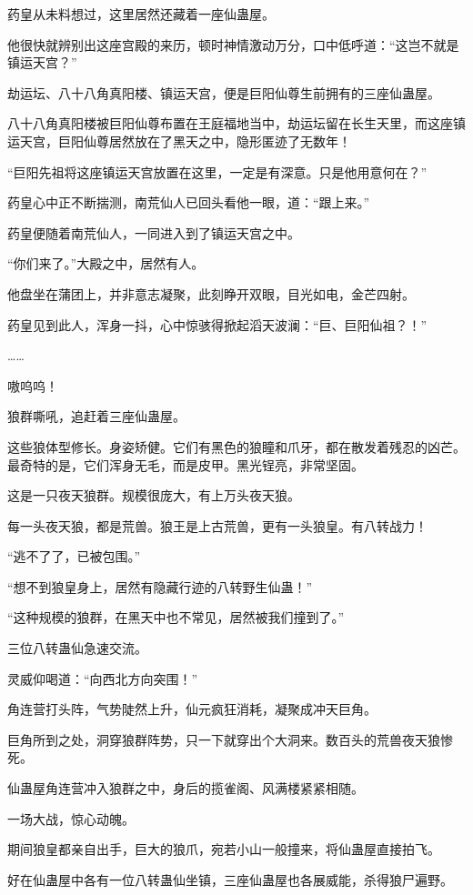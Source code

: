 \begin{this_body}
药皇从未料想过，这里居然还藏着一座仙蛊屋。

他很快就辨别出这座宫殿的来历，顿时神情激动万分，口中低呼道：“这岂不就是镇运天宫？”

劫运坛、八十八角真阳楼、镇运天宫，便是巨阳仙尊生前拥有的三座仙蛊屋。

八十八角真阳楼被巨阳仙尊布置在王庭福地当中，劫运坛留在长生天里，而这座镇运天宫，巨阳仙尊居然放在了黑天之中，隐形匿迹了无数年！

“巨阳先祖将这座镇运天宫放置在这里，一定是有深意。只是他用意何在？”

药皇心中正不断揣测，南荒仙人已回头看他一眼，道：“跟上来。”

药皇便随着南荒仙人，一同进入到了镇运天宫之中。

“你们来了。”大殿之中，居然有人。

他盘坐在蒲团上，并非意志凝聚，此刻睁开双眼，目光如电，金芒四射。

药皇见到此人，浑身一抖，心中惊骇得掀起滔天波澜：“巨、巨阳仙祖？！”

……

嗷呜呜！

狼群嘶吼，追赶着三座仙蛊屋。

这些狼体型修长。身姿矫健。它们有黑色的狼瞳和爪牙，都在散发着残忍的凶芒。最奇特的是，它们浑身无毛，而是皮甲。黑光锃亮，非常坚固。

这是一只夜天狼群。规模很庞大，有上万头夜天狼。

每一头夜天狼，都是荒兽。狼王是上古荒兽，更有一头狼皇。有八转战力！

“逃不了了，已被包围。”

“想不到狼皇身上，居然有隐藏行迹的八转野生仙蛊！”

“这种规模的狼群，在黑天中也不常见，居然被我们撞到了。”

三位八转蛊仙急速交流。

灵威仰喝道：“向西北方向突围！”

角连营打头阵，气势陡然上升，仙元疯狂消耗，凝聚成冲天巨角。

巨角所到之处，洞穿狼群阵势，只一下就穿出个大洞来。数百头的荒兽夜天狼惨死。

仙蛊屋角连营冲入狼群之中，身后的揽雀阁、风满楼紧紧相随。

一场大战，惊心动魄。

期间狼皇都亲自出手，巨大的狼爪，宛若小山一般撞来，将仙蛊屋直接拍飞。

好在仙蛊屋中各有一位八转蛊仙坐镇，三座仙蛊屋也各展威能，杀得狼尸遍野。


\end{this_body}
